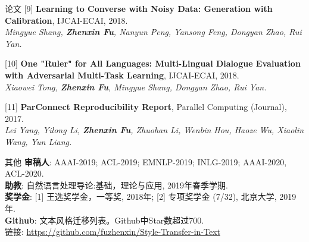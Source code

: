 \documentclass{resume} %
\begin{document}
\begin{rSection}{论文}
    [9] \textbf{Learning to Converse with Noisy Data: Generation with Calibration}, IJCAI-ECAI, 2018. \\
    {\it Mingyue Shang, \textbf{Zhenxin Fu}, Nanyun Peng, Yansong Feng, Dongyan Zhao, Rui Yan.} 

    [10] \textbf{One "Ruler" for All Languages: Multi-Lingual Dialogue Evaluation with Adversarial Multi-Task Learning}, IJCAI-ECAI, 2018. \\
    {\it Xiaowei Tong, \textbf{Zhenxin Fu}, Mingyue Shang, Dongyan Zhao, Rui Yan.}

    [11] \textbf{ParConnect Reproducibility Report}, Parallel Computing (Journal), 2017.\\
    {\it Lei Yang, Yilong Li, \textbf{Zhenxin Fu}, Zhuohan Li, Wenbin Hou, Haoze Wu, Xiaolin Wang, Yun Liang.}
    
\end{rSection}
    
    
\begin{rSection}{其他}
    \textbf{审稿人}: AAAI-2019; ACL-2019; EMNLP-2019; INLG-2019; AAAI-2020, ACL-2020. \\
    \textbf{助教}: 自然语言处理导论:基础，理论与应用, 2019年春季学期. \\
    \textbf{奖学金}: [1] 王选奖学金，一等奖, 2018年; [2] 专项奖学金 (7/32), 北京大学, 2019年. \\
    \textbf{Github}: 文本风格迁移列表。Github中Star数超过700. \\链接: \url{https://github.com/fuzhenxin/Style-Transfer-in-Text}
\end{rSection}
\end{document}
